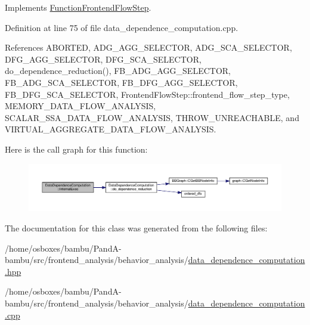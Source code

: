 Implements \hyperlink{classFunctionFrontendFlowStep_a00612f7fb9eabbbc8ee7e39d34e5ac68}{Function\+Frontend\+Flow\+Step}.



Definition at line 75 of file data\+\_\+dependence\+\_\+computation.\+cpp.



References A\+B\+O\+R\+T\+ED, A\+D\+G\+\_\+\+A\+G\+G\+\_\+\+S\+E\+L\+E\+C\+T\+OR, A\+D\+G\+\_\+\+S\+C\+A\+\_\+\+S\+E\+L\+E\+C\+T\+OR, D\+F\+G\+\_\+\+A\+G\+G\+\_\+\+S\+E\+L\+E\+C\+T\+OR, D\+F\+G\+\_\+\+S\+C\+A\+\_\+\+S\+E\+L\+E\+C\+T\+OR, do\+\_\+dependence\+\_\+reduction(), F\+B\+\_\+\+A\+D\+G\+\_\+\+A\+G\+G\+\_\+\+S\+E\+L\+E\+C\+T\+OR, F\+B\+\_\+\+A\+D\+G\+\_\+\+S\+C\+A\+\_\+\+S\+E\+L\+E\+C\+T\+OR, F\+B\+\_\+\+D\+F\+G\+\_\+\+A\+G\+G\+\_\+\+S\+E\+L\+E\+C\+T\+OR, F\+B\+\_\+\+D\+F\+G\+\_\+\+S\+C\+A\+\_\+\+S\+E\+L\+E\+C\+T\+OR, Frontend\+Flow\+Step\+::frontend\+\_\+flow\+\_\+step\+\_\+type, M\+E\+M\+O\+R\+Y\+\_\+\+D\+A\+T\+A\+\_\+\+F\+L\+O\+W\+\_\+\+A\+N\+A\+L\+Y\+S\+IS, S\+C\+A\+L\+A\+R\+\_\+\+S\+S\+A\+\_\+\+D\+A\+T\+A\+\_\+\+F\+L\+O\+W\+\_\+\+A\+N\+A\+L\+Y\+S\+IS, T\+H\+R\+O\+W\+\_\+\+U\+N\+R\+E\+A\+C\+H\+A\+B\+LE, and V\+I\+R\+T\+U\+A\+L\+\_\+\+A\+G\+G\+R\+E\+G\+A\+T\+E\+\_\+\+D\+A\+T\+A\+\_\+\+F\+L\+O\+W\+\_\+\+A\+N\+A\+L\+Y\+S\+IS.

Here is the call graph for this function\+:
\nopagebreak
\begin{figure}[H]
\begin{center}
\leavevmode
\includegraphics[width=350pt]{d3/dc0/classDataDependenceComputation_a573697b6cf02065e9365aee8e208fdc1_cgraph}
\end{center}
\end{figure}


The documentation for this class was generated from the following files\+:\begin{DoxyCompactItemize}
\item 
/home/osboxes/bambu/\+Pand\+A-\/bambu/src/frontend\+\_\+analysis/behavior\+\_\+analysis/\hyperlink{data__dependence__computation_8hpp}{data\+\_\+dependence\+\_\+computation.\+hpp}\item 
/home/osboxes/bambu/\+Pand\+A-\/bambu/src/frontend\+\_\+analysis/behavior\+\_\+analysis/\hyperlink{data__dependence__computation_8cpp}{data\+\_\+dependence\+\_\+computation.\+cpp}\end{DoxyCompactItemize}
